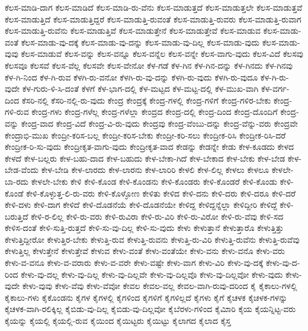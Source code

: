 {ಕೆಲಸ-ಮಾಡಿ-ದಾಗ
ಕೆಲಸ-ಮಾಡಿದೆ
ಕೆಲಸ-ಮಾಡಿ-ರು-ವೆನು
ಕೆಲಸ-ಮಾಡುತ್ತದೆ
ಕೆಲಸ-ಮಾಡುತ್ತಲೇ
ಕೆಲಸ-ಮಾಡುತ್ತವೆ
ಕೆಲಸ-ಮಾಡುತ್ತಿದೆ
ಕೆಲಸ-ಮಾಡುತ್ತಿದ್ದರೆ
ಕೆಲಸ-ಮಾಡುತ್ತಿ-ರುವಂತೆ
ಕೆಲಸ-ಮಾಡುತ್ತಿ-ರುವರು
ಕೆಲಸ-ಮಾಡುತ್ತಿ-ರುವಾಗ
ಕೆಲಸ-ಮಾಡುತ್ತಿ-ರುವೆನು
ಕೆಲಸ-ಮಾಡುತ್ತಿವೆ
ಕೆಲಸ-ಮಾಡುತ್ತೇನೆ
ಕೆಲಸ-ಮಾಡುತ್ತೇವೆ
ಕೆಲಸ-ಮಾಡುವ
ಕೆಲಸ-ಮಾಡು-ವಂತೆ
ಕೆಲಸ-ಮಾಡು-ವು-ದಕ್ಕೆ
ಕೆಲಸ-ಮಾಡು-ವು-ದನ್ನು
ಕೆಲಸ-ಮಾಡು-ವು-ದಿಲ್ಲ
ಕೆಲಸ-ಮಾಡು-ವುದು
ಕೆಲಸ-ಮಾಡು-ವುವು
ಕೆಲಸ-ಮಾಡುವೆ
ಕೆಲಸ-ವನ್ನು
ಕೆಲಸ-ವನ್ನೂ
ಕೆಲಸ-ವನ್ನೆಲ
ಕೆಲಸ-ವನ್ನೇ
ಕೆಲಸ-ವಾಗು-ವುದು
ಕೆಲಸ-ವಿದೆ
ಕೆಲಸವು
ಕೆಲಸವೂ
ಕೆಲಸವೆ
ಕೆಲಸ-ವೆಲ್ಲ
ಕೆಲಸವೇ
ಕೆಲಸ-ವೇನೋ
ಕೆಳ-ಗಡೆ
ಕೆಳ-ಗಿನ
ಕೆಳ-ಗಿನ-ದನ್ನು
ಕೆಳ-ಗಿನದು
ಕೆಳ-ಗಿನವು
ಕೆಳ-ಗಿ-ನಿಂದ
ಕೆಳ-ಗಿ-ರುವ
ಕೆಳಗಿ-ರು-ವನೋ
ಕೆಳಗಿ-ರು-ವು-ದನ್ನು
ಕೆಳಗಿ-ರು-ವುದು
ಕೆಳಗಿ-ರು-ವುದೂ
ಕೆಳ-ಗಿ-ರು-ವುದೇ
ಕೆಳ-ಗುರು-ಳಿ-ಸಿ-ದಂತೆ
ಕೆಳಗೆ
ಕೆಳ-ಭಾಗ-ದಲ್ಲಿ
ಕೆಳ-ಮಟ್ಟದ
ಕೆಳ-ಮಟ್ಟ-ದಲ್ಲಿ
ಕೆಳ-ಮುಖ-ವಾಗಿ
ಕೆಳ-ವರ್ಗ-ದಿಂದ
ಕೆಸರಿ-ನಲ್ಲಿ
ಕೆಸರಿ-ನಲ್ಲಿ-ರು-ವುದು
ಕೇಂದ್ರ
ಕೇಂದ್ರಕ್ಕೆ
ಕೇಂದ್ರ-ಗಳಲ್ಲಿ
ಕೇಂದ್ರ-ಗಳಿಗೆ
ಕೇಂದ್ರ-ಗಳಿರ-ಬೇಕು
ಕೇಂದ್ರ-ಗಳಿ-ರುವ
ಕೇಂದ್ರ-ಗಳು
ಕೇಂದ್ರ-ಗಳೆಲ್ಲ
ಕೇಂದ್ರ-ಗಳೆಲ್ಲಾ
ಕೇಂದ್ರದ
ಕೇಂದ್ರ-ದಲ್ಲಿ
ಕೇಂದ್ರ-ದಿಂದ
ಕೇಂದ್ರ-ದೊಂದಿಗೆ
ಕೇಂದ್ರ-ವನ್ನು
ಕೇಂದ್ರ-ವಾದ
ಕೇಂದ್ರ-ವಿದೆ
ಕೇಂದ್ರ-ವಿ-ರು-ವುದು
ಕೇಂದ್ರವು
ಕೇಂದ್ರ-ವೆಂಬು-ದನ್ನು
ಕೇಂದ್ರ-ವೆನ್ನು-ವರು
ಕೇಂದ್ರವೇ
ಕೇಂದ್ರಾಭಿ-ಮುಖ
ಕೇಂದ್ರೀ-ಕರಿಸ-ಬಲ್ಲ
ಕೇಂದ್ರೀ-ಕರಿಸ-ಬೇಕು
ಕೇಂದ್ರೀ-ಕರಿ-ಸಲು
ಕೇಂದ್ರೀಕ-ರಿಸಿ
ಕೇಂದ್ರೀಕ-ರಿಸಿ-ದರೆ
ಕೇಂದ್ರೀಕ-ರಿ-ಸು-ವುದು
ಕೇಂದ್ರೀಕೃತ-ವಾಗು-ವುದು
ಕೇಂದ್ರೀಕೃತ-ವಾದ
ಕೇಡನ್ನು
ಕೇಡನ್ನೇ
ಕೇಡು
ಕೇಳ-ಕೂಡದು
ಕೇಳದ
ಕೇಳದೆ
ಕೇಳ-ಬಲ್ಲರು
ಕೇಳ-ಬಹು-ದಾದ
ಕೇಳ-ಬಹುದು
ಕೇಳ-ಬೇಕಾ-ಗಿದೆ
ಕೇಳ-ಬೇಕಾದ
ಕೇಳ-ಬೇಕು
ಕೇಳ-ಬೇಡ
ಕೇಳ-ಬೇಡ-ವೆಂದು
ಕೇಳ-ಬೇಡಿ
ಕೇಳ-ಲಾರದು
ಕೇಳ-ಲಾರನು
ಕೇಳ-ಲಾರಿರಿ
ಕೇಳಲಿ
ಕೇಳ-ಲಿಲ್ಲ
ಕೇಳಲು
ಕೇಳಲೂ
ಕೇಳಲೇ-ಬಾ-ರದು
ಕೇಳಲೇ-ಬೇಕು
ಕೇಳಿ
ಕೇಳಿ-ಕೊಂಡ
ಕೇಳಿ-ಕೊಂಡನು
ಕೇಳಿ-ಕೊಂಡರು
ಕೇಳಿ-ಕೊಂಡರೆ
ಕೇಳಿ-ಕೊಂಡು
ಕೇಳಿ-ಕೊಂಡೆ
ಕೇಳಿ-ಕೊಳ್ಳುತ್ತ-ಲಿ-ರು-ವರು
ಕೇಳಿ-ಕೊಳ್ಳೋಣ
ಕೇಳಿತು
ಕೇಳಿದ
ಕೇಳಿ-ದನು
ಕೇಳಿ-ದರು
ಕೇಳಿ-ದರೂ
ಕೇಳಿ-ದರೆ
ಕೇಳಿ-ದಳು
ಕೇಳಿ-ದಾಗ
ಕೇಳಿದೆ
ಕೇಳಿ-ದೊಡನೆಯೆ
ಕೇಳಿ-ದೊಡನೆಯೇ
ಕೇಳಿದ್ದ
ಕೇಳಿದ್ದನ್ನೆಲ್ಲಾ
ಕೇಳಿದ್ದೀರಿ
ಕೇಳಿದ್ದೆ
ಕೇಳಿ-ಬರುತ್ತಿದೆ
ಕೇಳಿ-ರ-ಲಿಲ್ಲ
ಕೇಳಿ-ರು-ವರು
ಕೇಳಿ-ರುವಿರಾ
ಕೇಳಿ-ರು-ವಿರಿ
ಕೇಳಿ-ರು-ವಿರೋ
ಕೇಳಿ-ರು-ವೆವು
ಕೇಳಿ-ಸದ
ಕೇಳಿಸ-ದಂತೆ
ಕೇಳಿ-ಸುತ್ತಿ-ರುತ್ತದೆ
ಕೇಳಿ-ಸು-ವು-ದಿಲ್ಲ
ಕೇಳಿ-ಸು-ವುದು
ಕೇಳು
ಕೇಳುತ್ತಾನೆ
ಕೇಳುತ್ತಾರೊ
ಕೇಳುತ್ತಿತ್ತು
ಕೇಳುತ್ತಿದ್ದೀರೋ
ಕೇಳುತ್ತಿರ-ಬೇಕು
ಕೇಳುತ್ತಿ-ರುವ
ಕೇಳುತ್ತಿ-ರುವನು
ಕೇಳುತ್ತಿ-ರು-ವಿರಿ
ಕೇಳುತ್ತಿ-ರುವೆನು
ಕೇಳುತ್ತಿ-ರುವೆವು
ಕೇಳುತ್ತಿಲ್ಲ
ಕೇಳುತ್ತೇನೆ
ಕೇಳುತ್ತೇವೆ
ಕೇಳುವ
ಕೇಳು-ವಂತೆ
ಕೇಳು-ವಂತೆಯೇ
ಕೇಳು-ವನು
ಕೇಳು-ವನೊ
ಕೇಳು-ವರು
ಕೇಳು-ವ-ವನೂ
ಕೇಳು-ವ-ವರಾರು
ಕೇಳು-ವ-ವರೇ
ಕೇಳು-ವಷ್ಟೇ
ಕೇಳು-ವಾಗ
ಕೇಳು-ವಿರಿ
ಕೇಳು-ವು-ದಕ್ಕೆ
ಕೇಳು-ವು-ದ-ರಿಂದ
ಕೇಳು-ವು-ದಲ್ಲ
ಕೇಳು-ವು-ದಿಲ್ಲ
ಕೇಳು-ವು-ದಿಲ್ಲವೇ
ಕೇಳು-ವು-ದಿಲ್ಲವೊ
ಕೇಳು-ವು-ದಿಲ್ಲವೋ
ಕೇಳು-ವುದು
ಕೇಳು-ವುದೇ
ಕೇಳು-ವುವು
ಕೇಳು-ವೆವು
ಕೇಳು-ವೆವೋ
ಕೇವಲ
ಕೇವಲ-ವಲ್ಲ
ಕೇವಲ-ವಾಗಿ-ರುವು-ದರಿಂದ
ಕೈ
ಕೈಕಾಲು-ಗಳಲ್ಲಿ
ಕೈಕಾಲು-ಗಳು
ಕೈಕೊಂಡನು
ಕೈಗಳ
ಕೈಗಳಲ್ಲಿ
ಕೈಗಳಿಂದ
ಕೈಗಳಿಗೆ
ಕೈಗಳಿಲ್ಲದೆ
ಕೈಗಳು
ಕೈಗೆ
ಕೈಚಳಕ
ಕೈಚಳಕ-ಗಳನ್ನು
ಕೈಚಳಕ-ವಾಗಿ-ರಲಿಕ್ಕಿಲ್ಲ
ಕೈಬಿಡು-ವು-ದಿಲ್ಲ
ಕೈಬಿಡು-ವು-ದಿಲ್ಲವೋ
ಕೈಬೆರಳು-ಗಳಿಂದ
ಕೈಮಿಾರಿ
ಕೈಯ
ಕೈಯನ್ನಿಟ್ಟ-ವರು
ಕೈಯನ್ನು
ಕೈಯಲ್ಲಿ
ಕೈಯಲ್ಲಿ-ರುವ
ಕೈಯಿಂದ
ಕೈಯಿಟ್ಟರು
ಕೈಯಿಟ್ಟು
ಕೈಲಾಗದ
ಕೈಲಾದ
ಕೈಸ್ತ
}

